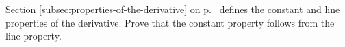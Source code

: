 Section \ref{subsec:properties-of-the-derivative} on p.~\pageref{subsec:properties-of-the-derivative}
defines the constant and line properties of the derivative.
Prove that the constant property follows from the line property.
